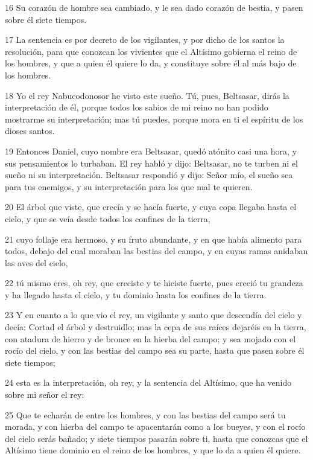 \par 16 Su corazón de hombre sea cambiado, y le sea dado corazón de bestia, y pasen sobre él siete tiempos.
\par 17 La sentencia es por decreto de los vigilantes, y por dicho de los santos la resolución, para que conozcan los vivientes que el Altísimo gobierna el reino de los hombres, y que a quien él quiere lo da, y constituye sobre él al más bajo de los hombres.
\par 18 Yo el rey Nabucodonosor he visto este sueño. Tú, pues, Beltsasar, dirás la interpretación de él, porque todos los sabios de mi reino no han podido mostrarme su interpretación; mas tú puedes, porque mora en ti el espíritu de los dioses santos.
\par 19 Entonces Daniel, cuyo nombre era Beltsasar, quedó atónito casi una hora, y sus pensamientos lo turbaban. El rey habló y dijo: Beltsasar, no te turben ni el sueño ni su interpretación. Beltsasar respondió y dijo: Señor mío, el sueño sea para tus enemigos, y su interpretación para los que mal te quieren.
\par 20 El árbol que viste, que crecía y se hacía fuerte, y cuya copa llegaba hasta el cielo, y que se veía desde todos los confines de la tierra,
\par 21 cuyo follaje era hermoso, y su fruto abundante, y en que había alimento para todos, debajo del cual moraban las bestias del campo, y en cuyas ramas anidaban las aves del cielo,
\par 22 tú mismo eres, oh rey, que creciste y te hiciste fuerte, pues creció tu grandeza y ha llegado hasta el cielo, y tu dominio hasta los confines de la tierra.
\par 23 Y en cuanto a lo que vio el rey, un vigilante y santo que descendía del cielo y decía: Cortad el árbol y destruidlo; mas la cepa de sus raíces dejaréis en la tierra, con atadura de hierro y de bronce en la hierba del campo; y sea mojado con el rocío del cielo, y con las bestias del campo sea su parte, hasta que pasen sobre él siete tiempos;
\par 24 esta es la interpretación, oh rey, y la sentencia del Altísimo, que ha venido sobre mi señor el rey:
\par 25 Que te echarán de entre los hombres, y con las bestias del campo será tu morada, y con hierba del campo te apacentarán como a los bueyes, y con el rocío del cielo serás bañado; y siete tiempos pasarán sobre ti, hasta que conozcas que el Altísimo tiene dominio en el reino de los hombres, y que lo da a quien él quiere.
